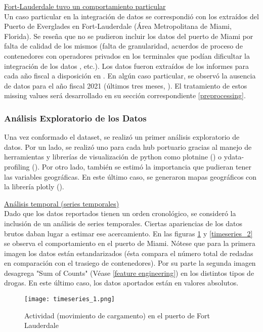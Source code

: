 \documentclass[12pt]{article}
\begin{document}
		\underline{Fort-Lauderdale tuvo un comportamiento particular}\\
		Un caso particular en la integración de datos se correspondió con los extraídos del Puerto de Everglades en Fort-Lauderdale (Área Metropolitana de Miami, Florida). Se reseña que no se pudieron incluir los datos del puerto de Miami por falta de calidad de los mismos (falta de granularidad, acuerdos de proceso de contenedores con operadores privados en los terminales que podían dificultar la integración de los datos \cite{portmiami2025cargo}, etc.). Los datos fueron extraídos de los informes para cada año fiscal a disposición en \cite{porteverglades2025stats}. En algún caso particular, se observó la ausencia de datos para el año fiscal 2021 (últimos tres meses, \cite{porteverglades2021teus}). El tratamiento de estos missing values será desarrollado en su sección correspondiente \ref{preprocessing}.
		
		\subsubsection{\label{EDA}Análisis Exploratorio de los Datos}
		Una vez conformado el dataset, se realizó un primer análisis exploratorio de datos. Por un lado, se realizó uno para cada hub portuario gracias al manejo de herramientas y librerías de visualización de python como plotnine (\cite{plotnine2025}) o ydata-profiling (\cite{ydata2025profiling}). Por otro lado, también se estimó la importancia que pudieran tener las variables geográficas. En este último caso, se generaron mapas geográficos con la librería plotly (\cite{plotly2025python}).

		\underline{Análisis temporal (series temporales)}\\
		Dado que los datos reportados tienen un orden cronológico, se consideró la inclusión de un análisis de series temporales. Ciertas apariencias de los datos brutos daban lugar a estimar ese acercamiento. En las figuras \ref{timeseries_1} y \ref{timeseries_2} se observa el comportamiento en el puerto de Miami. Nótese que para la primera imagen los datos están estandarizados (ésta compara el número total de redadas en comparación con el trasiego de contenedores). Por su parte la segunda imagen desagrega "Sum of Counts" (Véase \ref{feature engineering}) en los distintos tipos de drogas. En este último caso, los datos aportados están en valores absolutos.
		\begin{figure}[H]
			\caption{\label{timeseries_1} Actividad (movimiento de cargamento) en el puerto de Fort Lauderdale}
			\centering
			\hspace*{1cm}
			\texttt{[image: timeseries\_1.png]}
		\end{figure}
	
\end{document}

